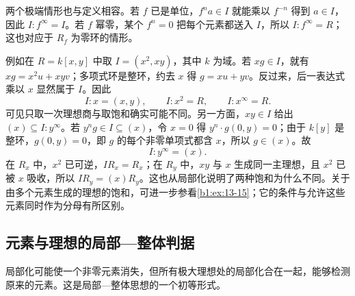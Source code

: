 \ProseParagraphBreak
两个极端情形也与定义相容。若 \(f\) 已是单位，\(f^na\in I\) 就能乘以 \(f^{-n}\) 得到 \(a\in I\)，因此 \(I:f^\infty=I\)。若 \(f\) 幂零，某个 \(f^n=0\) 把每个元素都送入 \(I\)，所以 \(I:f^\infty=R\)；这也对应于 \(R_f\) 为零环的情形。

\ProseParagraphBreak
例如在 \(R=k[x,y]\) 中取 \(I=(x^2,xy)\)，其中 \(k\) 为域。若 \(xg\in I\)，就有 \(xg=x^2u+xyv\)；多项式环是整环，约去 \(x\) 得 \(g=xu+yv\)。反过来，后一表达式乘以 \(x\) 显然属于 \(I\)。因此
\[
	I:x=(x,y),\qquad I:x^2=R,\qquad I:x^\infty=R.
\]
可见只取一次理想商与取饱和确实可能不同。另一方面，\(xy\in I\) 给出 \((x)\subseteq I:y^\infty\)。若 \(y^ng\in I\subseteq(x)\)，令 \(x=0\) 得 \(y^n\cdot g(0,y)=0\)；由于 \(k[y]\) 是整环，\(g(0,y)=0\)，即 \(g\) 的每个非零单项式都含 \(x\)，所以 \(g\in(x)\)。故
\[
	I:y^\infty=(x).
\]
在 \(R_x\) 中，\(x^2\) 已可逆，\(IR_x=R_x\)；在 \(R_y\) 中，\(xy\) 与 \(x\) 生成同一主理想，且 \(x^2\) 已被 \(x\) 吸收，所以 \(IR_y=(x)R_y\)。这也从局部化说明了两种饱和为什么不同。关于由多个元素生成的理想的饱和，可进一步参看\cref{b1:ex:13-15}；它的条件与允许这些元素同时作为分母有所区别。

\subsection{元素与理想的局部—整体判据}
\label{b1:subsec:1304:03}

局部化可能使一个非零元素消失，但所有极大理想处的局部化合在一起，能够检测原来的元素。这是局部—整体思想的一个初等形式。

